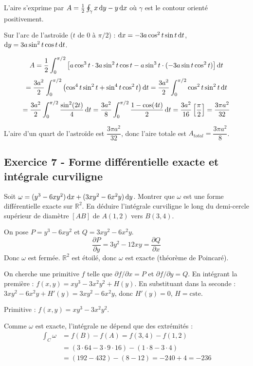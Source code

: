 \documentclass[12pt,a4paper]{article}
\begin{document}
\begin{boitecorrige}
L'aire s'exprime par $A = \frac{1}{2}\oint_\gamma x\,\mathrm{d} y - y\,\mathrm{d} x$ où $\gamma$ est le contour orienté positivement.

Sur l'arc de l'astroïde ($t$ de 0 à $\pi/2$) : $\mathrm{d} x = -3a\cos^2 t\sin t\,\mathrm{d} t$, $\mathrm{d} y = 3a\sin^2 t\cos t\,\mathrm{d} t$.

\[
A = \frac{1}{2}\int_0^{\pi/2}\left[a\cos^3 t\cdot3a\sin^2 t\cos t - a\sin^3 t\cdot(-3a\sin t\cos^2 t)\right]\mathrm{d} t
\]
\[
= \frac{3a^2}{2}\int_0^{\pi/2}\left(\cos^4 t\sin^2 t + \sin^4 t\cos^2 t\right)\mathrm{d} t
= \frac{3a^2}{2}\int_0^{\pi/2}\cos^2 t\sin^2 t\,\mathrm{d} t
\]
\[
= \frac{3a^2}{2}\int_0^{\pi/2}\frac{\sin^2(2t)}{4}\,\mathrm{d} t = \frac{3a^2}{8}\int_0^{\pi/2}\frac{1-\cos(4t)}{2}\,\mathrm{d} t = \frac{3a^2}{16}\left[\frac{\pi}{2}\right] = \frac{3\pi a^2}{32}
\]

L'aire d'un quart de l'astroïde est $\dfrac{3\pi a^2}{32}$, donc l'aire totale est $A_{total} = \dfrac{3\pi a^2}{8}$.
\end{boitecorrige}


\subsection*{Exercice 7 - Forme différentielle exacte et intégrale curviligne \niveau{\moyen}}

\begin{boiteexercice}
Soit $\omega = (y^3 - 6xy^2)\,\mathrm{d} x + (3xy^2 - 6x^2y)\,\mathrm{d} y$. Montrer que $\omega$ est une forme différentielle exacte sur $\mathbb{R}^2$. En déduire l'intégrale curviligne le long du demi-cercle supérieur de diamètre $[AB]$ de $A(1,2)$ vers $B(3,4)$.
\end{boiteexercice}

\begin{boitecorrige}
On pose $P = y^3 - 6xy^2$ et $Q = 3xy^2 - 6x^2y$.
\[
\frac{\partial P}{\partial y} = 3y^2 - 12xy = \frac{\partial Q}{\partial x}
\]
Donc $\omega$ est fermée. $\mathbb{R}^2$ est étoilé, donc $\omega$ est exacte (théorème de Poincaré).

On cherche une primitive $f$ telle que $\partial f/\partial x = P$ et $\partial f/\partial y = Q$.
En intégrant la première : $f(x,y) = xy^3 - 3x^2y^2 + H(y)$.
En substituant dans la seconde : $3xy^2 - 6x^2y + H'(y) = 3xy^2 - 6x^2y$, donc $H'(y) = 0$, $H = \text{cste}$.

Primitive : $f(x,y) = xy^3 - 3x^2y^2$.

Comme $\omega$ est exacte, l'intégrale ne dépend que des extrémités :
\begin{align*}
\int_C \omega &= f(B) - f(A) = f(3,4) - f(1,2)\\
&= (3\cdot64 - 3\cdot9\cdot16) - (1\cdot8 - 3\cdot4)\\
&= (192 - 432) - (8-12) = -240 + 4 = -236
\end{align*}
\end{boitecorrige}
\end{document}
